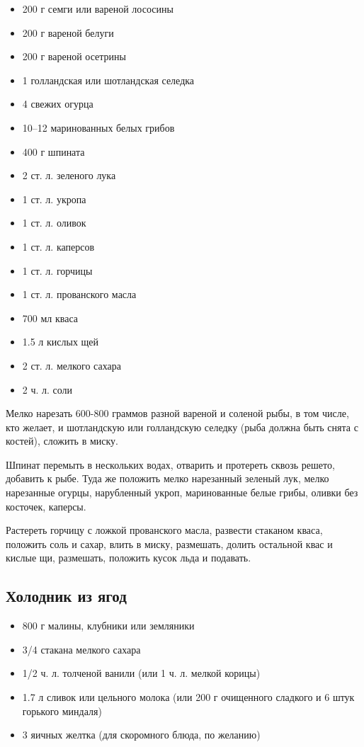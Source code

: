 \begin{itemize}
	\item 200 г семги или вареной лососины 
    \item 200 г вареной белуги 
    \item 200 г вареной осетрины
    \item 1 голландская или шотландская селедка 
    \item 4 свежих огурца 
    \item 10–12 маринованных белых грибов 
    \item 400 г шпината
    \item 2 ст. л. зеленого лука 
    \item 1 ст. л. укропа 
    \item 1 ст. л. оливок
    \item 1 ст. л. каперсов 
    \item 1 ст. л. горчицы
    \item 1 ст. л. прованского масла
    \item 700 мл кваса
    \item 1.5 л кислых щей 
    \item 2 ст. л. мелкого сахара
    \item 2 ч. л. соли
\end{itemize}

Мелко нарезать 600-800 граммов разной вареной и соленой рыбы, в том числе, кто желает, и шотландскую или голландскую селедку (рыба должна быть снята с костей), сложить в миску.

Шпинат перемыть в нескольких водах, отварить и протереть сквозь решето, добавить к рыбе. Туда же положить мелко нарезанный зеленый лук, мелко нарезанные огурцы, нарубленный укроп, маринованные белые грибы, оливки без косточек, каперсы.

Растереть горчицу с ложкой прованского масла, развести стаканом кваса, положить соль и сахар, влить в миску, размешать, долить остальной квас и кислые щи, размешать, положить кусок льда и подавать.

\subsection{Холодник из ягод}

\begin{itemize}
	\item 800 г малины, клубники или земляники 
    \item 3/4 стакана мелкого сахара
    \item 1/2 ч. л. толченой ванили (или 1 ч. л. мелкой корицы)
    \item 1.7 л сливок или цельного молока (или 200 г очищенного сладкого и 6 штук горького миндаля) 
    \item 3 яичных желтка (для скоромного блюда, по желанию)
\end{itemize}

